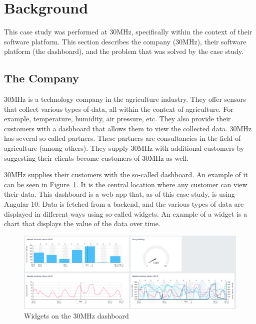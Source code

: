\section{Background}\label{sec:background}

This case study was performed at 30MHz, specifically within the context of their software platform. This section describes the company (30MHz), their software platform (the dashboard), and the problem that was solved by the case study.

\subsection{The Company}\label{sec:bg:thecompany}
30MHz is a technology company in the agriculture industry. They offer sensors that collect various types of data, all within the context of agriculture. For example, temperature, humidity, air pressure, etc. They also provide their customers with a dashboard that allows them to view the collected data. 30MHz has several so-called partners. These partners are consultancies in the field of agriculture (among others). They supply 30MHz with additional customers by suggesting their clients become customers of 30MHz as well.

30MHz supplies their customers with the so-called dashboard. An example of it can be seen in Figure~\ref{fig:bg:dashboard}. It is the central location where any customer can view their data. This dashboard is a web app that, as of this case study, is using Angular 10. Data is fetched from a backend, and the various types of data are displayed in different ways using so-called widgets. An example of a widget is a chart that displays the value of the data over time.

\begin{figure}[h]
	\includegraphics[width=\columnwidth]{figures/background/dashboard.png}
	\caption{Widgets on the 30MHz dashboard}
	\label{fig:bg:dashboard}
	\centering
\end{figure}

